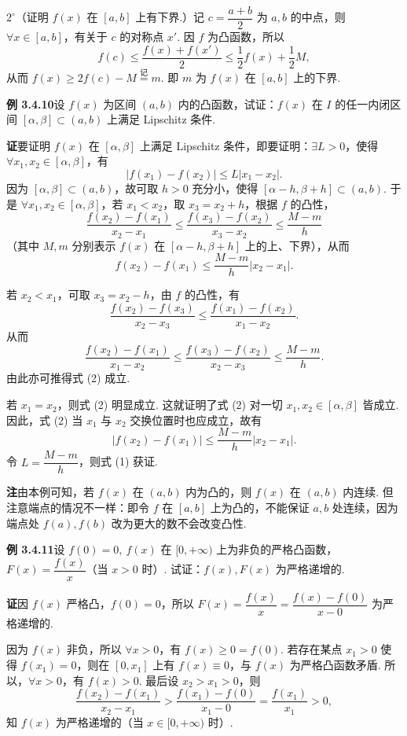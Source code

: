 \documentclass[UTF8, 12pt, fontset=fandol, oneside]{ctexart}
\begin{document}
$2^\circ$（证明 $f(x)$ 在 $[a,b]$ 上有下界.）记 $c=\dfrac{a+b}{2}$ 为 $a,b$ 的中点，则 $\forall x\in[a,b]$，有关于 $c$ 的对称点 $x'$. 因 $f$ 为凸函数，所以
\[
  f(c)\le \frac{f(x)+f(x')}{2}\le \frac12f(x)+\frac12M,
\]
从而 $f(x)\ge2f(c)-M\overset{\text{记}}{=}m$. 即 $m$ 为 $f(x)$ 在 $[a,b]$ 上的下界.

\noindent\textbf{例 3.4.10}\quad 设 $f(x)$ 为区间 $(a,b)$ 内的凸函数，试证：$f(x)$ 在 $I$ 的任一内闭区间 $[\alpha,\beta]\subset(a,b)$ 上满足 Lipschitz 条件.

\noindent\textbf{证}\quad 要证明 $f(x)$ 在 $[\alpha,\beta]$ 上满足 Lipschitz 条件，即要证明：$\exists L>0$，使得 $\forall x_1,x_2\in[\alpha,\beta]$，有
\[
  |f(x_1)-f(x_2)|\le L|x_1-x_2|. \tag{1}
\]
因为 $[\alpha,\beta]\subset(a,b)$，故可取 $h>0$ 充分小，使得 $[\alpha-h,\beta+h]\subset(a,b)$. 于是 $\forall x_1,x_2\in[\alpha,\beta]$，若 $x_1<x_2$，取 $x_3=x_2+h$，根据 $f$ 的凸性，
\[
  \frac{f(x_2)-f(x_1)}{x_2-x_1}
  \le \frac{f(x_3)-f(x_2)}{x_3-x_2}\le \frac{M-m}{h}
\]
（其中 $M,m$ 分别表示 $f(x)$ 在 $[\alpha-h,\beta+h]$ 上的上、下界），从而
\[
  f(x_2)-f(x_1)\le \frac{M-m}{h}|x_2-x_1|. \tag{2}
\]

若 $x_2<x_1$，可取 $x_3=x_2-h$，由 $f$ 的凸性，有
\[
  \frac{f(x_2)-f(x_3)}{x_2-x_3}
  \le \frac{f(x_1)-f(x_2)}{x_1-x_2}.
\]
从而
\[
  \frac{f(x_2)-f(x_1)}{x_1-x_2}
  \le \frac{f(x_3)-f(x_2)}{x_2-x_3}\le \frac{M-m}{h}.
\]
由此亦可推得式 (2) 成立.

若 $x_1=x_2$，则式 (2) 明显成立. 这就证明了式 (2) 对一切 $x_1,x_2\in[\alpha,\beta]$ 皆成立. 因此，式 (2) 当 $x_1$ 与 $x_2$ 交换位置时也应成立，故有
\[
  |f(x_2)-f(x_1)|\le \frac{M-m}{h}|x_2-x_1|.
\]
令 $L=\dfrac{M-m}{h}$，则式 (1) 获证.

\noindent\textbf{注}\quad 由本例可知，若 $f(x)$ 在 $(a,b)$ 内为凸的，则 $f(x)$ 在 $(a,b)$ 内连续. 但注意端点的情况不一样：即令 $f$ 在 $[a,b]$ 上为凸的，不能保证 $a,b$ 处连续，因为端点处 $f(a),f(b)$ 改为更大的数不会改变凸性.

\noindent\textbf{例 3.4.11}\quad 设 $f(0)=0,\ f(x)$ 在 $[0,+\infty)$ 上为非负的严格凸函数，$F(x)=\dfrac{f(x)}x$（当 $x>0$ 时）. 试证：$f(x),F(x)$ 为严格递增的.

\noindent\textbf{证}\quad 因 $f(x)$ 严格凸，$f(0)=0$，所以 $F(x)=\dfrac{f(x)}x=\dfrac{f(x)-f(0)}{x-0}$ 为严格递增的.

因为 $f(x)$ 非负，所以 $\forall x>0$，有 $f(x)\ge0=f(0)$. 若存在某点 $x_1>0$ 使得 $f(x_1)=0$，则在 $[0,x_1]$ 上有 $f(x)\equiv0$，与 $f(x)$ 为严格凸函数矛盾. 所以，$\forall x>0$，有 $f(x)>0$. 最后设 $x_2>x_1>0$，则
\[
  \frac{f(x_2)-f(x_1)}{x_2-x_1}
  >\frac{f(x_1)-f(0)}{x_1-0}=\frac{f(x_1)}{x_1}>0,
\]
知 $f(x)$ 为严格递增的（当 $x\in[0,+\infty)$ 时）.
\end{document}
